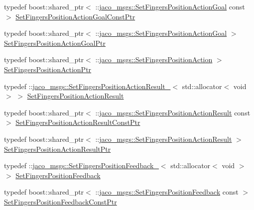 \begin{DoxyCompactItemize}
\item 
typedef boost\+::shared\+\_\+ptr$<$ \+::\hyperlink{namespacejaco__msgs_afb0458ba4bb87a09d2bb557f1e4351a4}{jaco\+\_\+msgs\+::\+Set\+Fingers\+Position\+Action\+Goal} const  $>$ \hyperlink{namespacejaco__msgs_ad2d28d9220bba6abe4251e4a990d0355}{Set\+Fingers\+Position\+Action\+Goal\+Const\+Ptr}
\item 
typedef boost\+::shared\+\_\+ptr$<$ \+::\hyperlink{namespacejaco__msgs_afb0458ba4bb87a09d2bb557f1e4351a4}{jaco\+\_\+msgs\+::\+Set\+Fingers\+Position\+Action\+Goal} $>$ \hyperlink{namespacejaco__msgs_a2ce95f08470d8c0e672a0baccd5fde5d}{Set\+Fingers\+Position\+Action\+Goal\+Ptr}
\item 
typedef boost\+::shared\+\_\+ptr$<$ \+::\hyperlink{namespacejaco__msgs_a6a86f786fe9f2e29693a22cec953c58c}{jaco\+\_\+msgs\+::\+Set\+Fingers\+Position\+Action} $>$ \hyperlink{namespacejaco__msgs_a007ea2a48542f4a92183d76f1325ffa8}{Set\+Fingers\+Position\+Action\+Ptr}
\item 
typedef \+::\hyperlink{structjaco__msgs_1_1SetFingersPositionActionResult__}{jaco\+\_\+msgs\+::\+Set\+Fingers\+Position\+Action\+Result\+\_\+}$<$ std\+::allocator$<$ void $>$ $>$ \hyperlink{namespacejaco__msgs_abe0caa1fc40ecf2de26ec686e3c4a0fb}{Set\+Fingers\+Position\+Action\+Result}
\item 
typedef boost\+::shared\+\_\+ptr$<$ \+::\hyperlink{namespacejaco__msgs_abe0caa1fc40ecf2de26ec686e3c4a0fb}{jaco\+\_\+msgs\+::\+Set\+Fingers\+Position\+Action\+Result} const  $>$ \hyperlink{namespacejaco__msgs_aee01d75d20086911a84dd80ddf97f132}{Set\+Fingers\+Position\+Action\+Result\+Const\+Ptr}
\item 
typedef boost\+::shared\+\_\+ptr$<$ \+::\hyperlink{namespacejaco__msgs_abe0caa1fc40ecf2de26ec686e3c4a0fb}{jaco\+\_\+msgs\+::\+Set\+Fingers\+Position\+Action\+Result} $>$ \hyperlink{namespacejaco__msgs_a86bbaee297d8ebb495034ab11eb539b4}{Set\+Fingers\+Position\+Action\+Result\+Ptr}
\item 
typedef \+::\hyperlink{structjaco__msgs_1_1SetFingersPositionFeedback__}{jaco\+\_\+msgs\+::\+Set\+Fingers\+Position\+Feedback\+\_\+}$<$ std\+::allocator$<$ void $>$ $>$ \hyperlink{namespacejaco__msgs_a27b05a5ba36d09c1620de5791e2362d0}{Set\+Fingers\+Position\+Feedback}
\item 
typedef boost\+::shared\+\_\+ptr$<$ \+::\hyperlink{namespacejaco__msgs_a27b05a5ba36d09c1620de5791e2362d0}{jaco\+\_\+msgs\+::\+Set\+Fingers\+Position\+Feedback} const  $>$ \hyperlink{namespacejaco__msgs_a4cd23b19230769d7622c5cbe9b85b418}{Set\+Fingers\+Position\+Feedback\+Const\+Ptr}

\end{DoxyCompactItemize}
